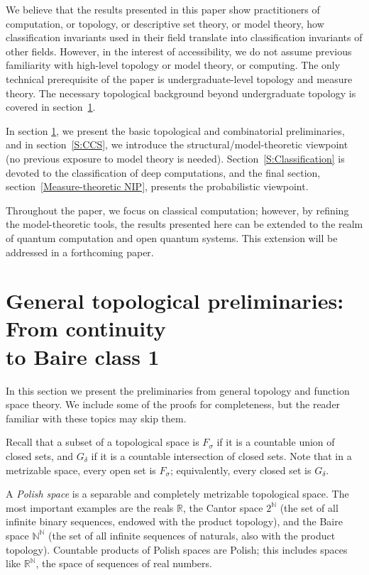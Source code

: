 \documentclass[psamsfonts]{amsart}
\theoremstyle{definition}
\theoremstyle{remark}
\numberwithin{equation}{section}
\begin{document}
We believe that the results presented in this paper show practitioners of computation, or topology, or descriptive set theory, or  model theory, how classification invariants used in their field translate into classification invariants of other fields.
However, in the interest of accessibility, we do not assume previous familiarity with high-level topology or model theory, or computing.
The only technical prerequisite of the paper is undergraduate-level topology and measure theory.
The necessary topological background beyond undergraduate topology is covered in section~\ref{sec:prelim}.

In section \ref{sec:prelim}, we present the basic topological and combinatorial preliminaries, and in section~\ref{S:CCS}, we introduce the structural/model-theoretic viewpoint (no previous exposure to model theory is needed).
Section~\ref{S:Classification} is devoted to the classification of deep computations, and the final section, section~\ref{Measure-theoretic NIP},  presents the probabilistic viewpoint.


Throughout the paper, we focus on classical computation; however, by refining the model-theoretic tools, the results presented here can be extended to the realm of quantum computation and open quantum systems.
This extension will be addressed in a forthcoming paper.

\tableofcontents


\section{General topological preliminaries: From continuity\\ to Baire class 1}
\label{sec:prelim}

In this section we present the preliminaries from general topology and function space theory.
We include some of the proofs for completeness, but the reader familiar with these topics may skip them.

Recall that a subset of a topological space is $F_\sigma$ if it is a countable union of closed  sets, and $G_\delta$ if it is a countable intersection of closed sets.
Note that in a metrizable space, every open set is $F_\sigma$; equivalently, every closed set is $G_\delta$.

A \emph{Polish space} is a separable and completely metrizable topological space.
The most important examples are the reals $\mathbb{R}$, the Cantor space $2^\mathbb{N}$ (the set of all infinite binary sequences, endowed with the product topology), and the Baire space $\mathbb{N}^\mathbb{N}$ (the set of all infinite sequences of naturals, also with the product topology).
Countable products of Polish spaces are Polish; this includes spaces like $\mathbb{R}^\mathbb{N}$, the space of sequences of real numbers.
\end{document}
